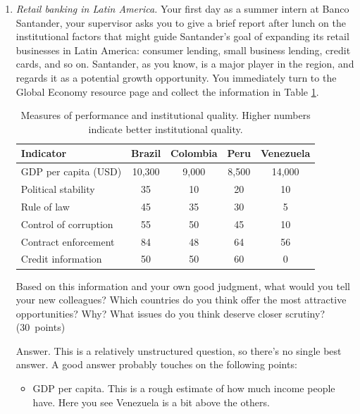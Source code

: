 \documentclass[letterpaper,12pt]{article}
\begin{document}
\begin{enumerate}
\begin{enumerate}
Grading: 3 points for mentioning equation (\ref{eq:lom-k}), 
1 for anything beyond that, 
1 more for the second equation.  

\end{enumerate}


\item {\it Retail banking in Latin America.\/}
Your first day as a summer intern at Banco Santander, 
your supervisor asks you to give a brief report after lunch on 
the institutional factors that might guide Santander's
goal of expanding its retail businesses in Latin America:
consumer lending, small business lending, credit cards, and so on.  
Santander, as you know, is a major player in the region, 
and regards it as a potential growth opportunity. 
You immediately turn to the Global Economy resource page and collect
the information in Table \ref{tab:institutions}.

%
 \begin{table}
    \centering
    \begin{tabular}{lcccc}
    \hline\hline
    Indicator    &  Brazil   & Colombia  &  Peru  &  Venezuela \\
    \hline\hline
    GDP per capita (USD) &  10,300  &  9,000 &  8,500  & 14,000 \\
    Political stability  &  35 &  10  &  20  &  10 \\
    Rule of law          &  45 &  35  &  30  &  5  \\
    Control of corruption&  55 &  50  &  45  &  10 \\
    Contract enforcement &  84 &  48  &  64  &  56 \\
    Credit information   &  50 &  50  &  60  &  0 \\
    \hline\hline
    \end{tabular}
    \caption{Measures of performance and institutional quality.
        Higher numbers indicate better institutional quality.}
    \label{tab:institutions}
\end{table}
%
Based on this information and your own good judgment, 
what would you tell your new colleagues? 
Which countries do you think offer the most attractive opportunities?  
Why?  
What issues do you think deserve closer scrutiny?    
(30~points) 

Answer.  This is a relatively unstructured question, 
so there's no single best answer.  
A good answer probably touches on the following points:
%
\begin{itemize}
\item GDP per capita. 
This is a rough estimate of how much income people have.
Here you see Venezuela is a bit above the others.  


\end{itemize}
\end{enumerate}
\end{document}
